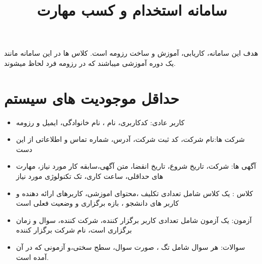 \documentclass{article}
\date{}
\title{ سامانه استخدام و کسب مهارت }
\begin{document}
\maketitle
هدف این سامانه، کاریابی، آموزش و  ساخت رزومه است. کلاس ها در این سامانه مانند یک دوره آموزشی میباشند که در رزومه فرد لحاظ میشوند.
\section{حداقل موجودیت های سیستم}
    \begin{itemize}
        \item کاربر عادی: کدکاربری، نام ، نام خانوادگی، ایمیل و رزومه
        \item شرکت ها:نام شرکت، کد ثبت شرکت، آدرس، شماره تماس و اطلاعاتی از این دست
        \item آگهی ها: شرکت، تاریخ شروع، تاریخ انقضا، متن آگهی،سابقه کار مورد نیاز، مهارت های حداقلی، ساعت کاری، تک تکنولوژی مورد نیاز
        \item کلاس : یک کلاس شامل تعدادی تکلیف ،محتوای اموزشی، کاربرهای ارائه دهنده و کاربر های دانشجو ، بازه برگزاری و وضعیت فعلی است
        \item آزمون: یک آزمون شامل تعدادی کاربر برگزار کننده، شرکت کننده، سوال و زمان برگزاری است، نام شرکت برگزار کننده
        \item سوالات: هر سوال شامل تگ ، صورت سوال، سطح سختی،و آزمونی که در آن آمده است.
    \end{itemize}
\end{document}
